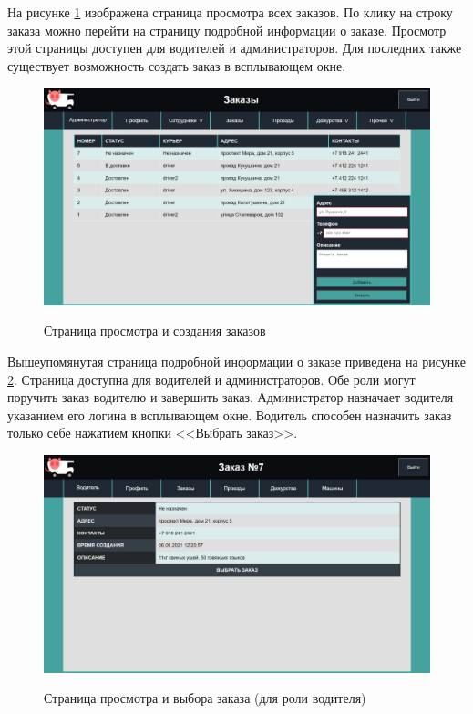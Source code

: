 На рисунке \ref{sc:all_delivery} изображена страница просмотра всех заказов. По клику на строку заказа можно перейти на страницу подробной информации о заказе. Просмотр этой страницы доступен для водителей и администраторов. Для последних также существует возможность создать заказ в всплывающем окне.
\begin{figure}[h!] 
	\begin{center}
		{\includegraphics[scale=0.43, angle=0]{sc/all_delivery}}
		\caption{Страница просмотра и создания заказов}
		\label{sc:all_delivery}
	\end{center}
\end{figure}

Вышеупомянутая страница подробной информации о заказе приведена на рисунке \ref{sc:pick_delivery}. Страница доступна для водителей и администраторов. Обе роли могут поручить заказ водителю и завершить заказ. Администратор назначает водителя указанием его логина в всплывающем окне. Водитель способен назначить заказ только себе нажатием кнопки <<Выбрать заказ>>.
\begin{figure}[h!] 
	\begin{center}
		{\includegraphics[scale=0.45, angle=0]{sc/pick_delivery}}
		\caption{Страница просмотра и выбора заказа (для роли водителя)}
		\label{sc:pick_delivery}
	\end{center}
\end{figure}

